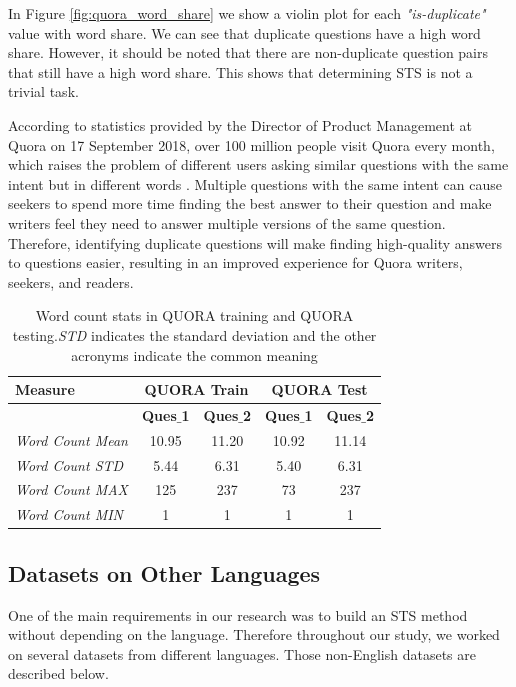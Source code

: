 \begin{enumerate}
In Figure \ref{fig:quora_word_share} we show a violin plot for each \textit{"is-duplicate"} value with word share. We can see that duplicate questions have a high word share. However, it should be noted that there are non-duplicate question pairs that still have a high word share. This shows that determining STS is not a trivial task. 

According to statistics provided by the Director of Product Management at Quora on 17 September 2018, over 100 million people visit Quora every month, which raises the problem of different users asking similar questions with the same intent but in different words \autocite{8967103}. Multiple questions with the same intent can cause seekers to spend more time finding the best answer to their question and make writers feel they need to answer multiple versions of the same question. Therefore, identifying duplicate questions will make finding high-quality answers to questions easier, resulting in an improved experience for Quora writers, seekers, and readers.


\begin{table}
	\centering
	\begin{tabular}{l|cc|cc}
		\hline
		Measure   & \multicolumn{2}{c|}{QUORA Train} & \multicolumn{2}{c}{QUORA Test} \\
		\hline
		\multicolumn{1}{l|}{} & \textbf{Ques$\_$1} & \textbf{Ques$\_$2} & \textbf{Ques$\_$1} & \textbf{Ques$\_$2} \\
		\textit{Word Count Mean} & 10.95 & 11.20 & 10.92 & 11.14  \\
		\textit{Word Count STD} & 5.44 & 6.31 & 5.40 & 6.31  \\
		\textit{Word Count MAX} & 125 & 237 & 73 & 237  \\
		\textit{Word Count MIN} & 1 & 1 & 1 & 1  \\
		\hline
	\end{tabular}
	\caption[Word count stats in QUORA]{Word count stats in QUORA training and QUORA testing.\textit{STD} indicates the standard deviation and the other acronyms indicate the common meaning }
	\label{table:quora_sts}
\end{table}
 
  


\end{enumerate}

\subsection{Datasets on Other Languages}
One of the main requirements in our research was to build an STS method without depending on the language. Therefore throughout our study, we worked on several datasets from different languages. Those non-English datasets are described below. 

